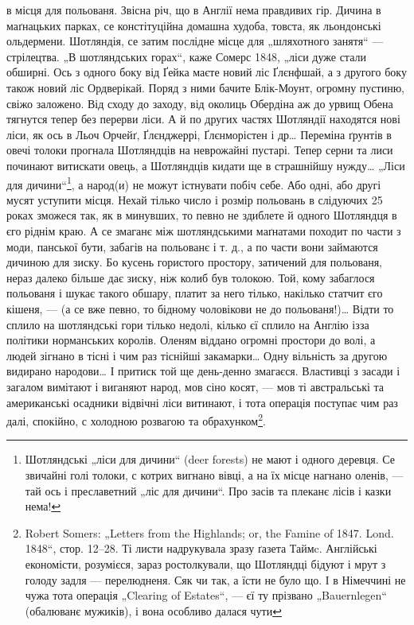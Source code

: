 \parcont{}
в місця для польованя. Звісна річ, що в Англії нема правдивих гір. Дичина в маґнацьких парках, се
констітуційна домашна худоба, товста, як льондонські ольдермени. Шотляндія, се затим послідне місце
для „шляхотного занятя“ — стрілецтва. „В шотляндських горах“, каже Сомерс 1848, „ліси дуже стали
обширні. Ось з одного боку від Ґейка маєте новий ліс Ґлєнфшай, а з другого боку також новий ліс
Ордверікай. Поряд з ними бачите Блік-Моунт, огромну пустиню, свіжо заложено. Від сходу до заходу,
від околиць Обердіна аж до урвищ Обена тягнутся тепер без перерви ліси. А й по других частях
Шотляндії находятся нові ліси, як ось в Льоч Орчейґ, Ґлєнджеррі, Ґлєнморістен і др\dots{} Переміна
ґрунтів в овечі толоки прогнала Шотляндців на неврожайні пустарі. Тепер серни та лиси починают
витискати овець, а Шотляндців кидати ще в страшнійшу нужду\dots{} „Ліси для дичини“\footnote{
Шотляндські „ліси для дичини“ (deer forests) не мают і одного деревця. Се звичайні голі толоки,
с котрих вигнано вівці, а на їх місце нагнано оленів, — тай ось і преславетний „ліс для дичини“. Про
засів та плеканє лісів і казки нема!
}, а народ(и) не
можут істнувати побіч себе. Або одні, або другі мусят уступити місця. Нехай тілько число і розмір
польовань в слідуючих 25 роках зможеся так, як в минувших, то певно не здиблете й одного Шотляндця в
єго ріднім краю. А се змаганє між шотляндськими маґнатами походит по части з моди, панської бути,
забагів на польованє і т. д., а по части вони займаются дичиною для зиску. Бо кусень гористого
простору, затичений для польованя, нераз далеко більше дає зиску, ніж колиб був толокою. Той, кому
забаглося польованя і шукає такого обшару, платит за него тілько, накілько статчит єго кішеня,
— (а се вже певно, то бідному чоловікови не до польованя!)\dots{} Відти то сплило на шотляндські гори
тілько недолі, кілько єї сплило на Англію ізза політики норманських
королів. Оленям віддано огромні простори до волі, а людей зігнано в тісні і чим раз тіснійші
закамарки\dots{} Одну вільність за другою видирано народови\dots{} І притиск той ще
день-денно змагаєся. Властивці з засади і загалом вимітают і виганяют народ, мов сіно косят, — мов
ті австральські та американські осадники відвічні ліси витинают, і тота операція поступає чим раз
далі, спокійно, с холодною розвагою та обрахунком\footnote{
Robert Somers: „Letters from the Highlands; or, the Famine of 1847. Lond. 1848“, стор. 12--28. Ті
листи надрукувала зразу ґазета Таймc. Англійські економісти, розумієся, зараз ростолкували, що
Шотляндці бідуют і мрут з голоду задля — перелюдненя. Сяк чи так, а їсти не було що. І в Німеччині
не чужа тота операція „Clearing of Estates“, — єї ту прізвано „Bauernlegen“ (обалюванє мужиків), і
вона особливо далася чути
}.

